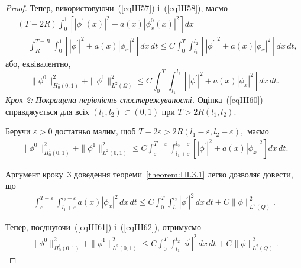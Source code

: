 \begin{proof}
Тепер, використовуючи~(\ref{eqIII57}) і~(\ref{eqIII58}), маємо
\begin{equation}\label{eqIII59}
    \begin{split}
    & (T-2R) \int^1_0 \left[|\phi^1(x)|^2 + a(x)|\phi^0_x(x)|^2\right] dx
    \\ & = \int^{T-R}_{R} \int^1_0
    \left[|\phi^\prime|^2 + a(x)|\phi_x|^2\right] dx\, dt
    \leq C \int^T_0 \int^{l_2}_{l_1} \left[|\phi^\prime|^2 + a(x)|\phi_x|^2\right] dx\, dt,
    \end{split}
\end{equation}
або, еквівалентно,
\begin{equation}\label{eqIII60}
    \|\phi^0\|^2_{H^1_0(0,1)} + \|\phi^1\|^2_{L^2(\Omega)}  \leq C \int^T_0 \int^{l_2}_{l_1} \left[|\phi^\prime|^2 + a(x)|\phi_x|^2\right] dx\, dt.
\end{equation}
\label{sec:III.4-d}
\emph{Крок 2: Покращена нерівність спостережуваності.}
Оцінка~(\ref{eqIII60}) справджується для всіх $(l_1, l_2) \subset (0,1)$ при $T > 2R(l_1, l_2)$.

Беручи $\varepsilon >0$ достатньо малим, щоб
$
T - 2\varepsilon > 2R(l_1 - \varepsilon, l_2 - \varepsilon),
$
маємо
\begin{equation}\label{eqIII61}
    \begin{split}
    \|\phi^0\|^2_{H^1_0(0,1)} + \|\phi^1\|^2_{L^2(0,1)}
    \leq C \int^{T-\varepsilon}_{\varepsilon} \int^{l_2-\varepsilon}_{l_1+\varepsilon}
    \left[|\phi^\prime|^2 + a(x)|\phi_x|^2\right] dx\, dt.
    \end{split}
\end{equation}

Аргумент кроку~3 доведення теореми~\ref{theorem:III.3.1} легко дозволяє довести, що
\begin{equation}\label{eqIII62}
    \begin{split}
    \int^{T-\varepsilon}_{\varepsilon} \int^{l_2-\varepsilon}_{l_1+\varepsilon}
    a(x) |\phi_x|^2\, dx\, dt
    \leq C \int^T_0 \int^{l_2}_{l_1} |\phi^\prime|^2\, dx\, dt + C\|\phi\|^{2}_{L^2(Q)}.
    \end{split}
\end{equation}

Тепер, поєднуючи~(\ref{eqIII61}) і~(\ref{eqIII62}), отримуємо
\begin{equation}\label{eqIII63}
    \begin{split}
    \|\phi^0\|^2_{H^1_{0}(0,1)} + \|\phi^1\|^2_{L^2(0,1)}
    \leq C \int^T_0 \int^{l_2}_{l_1} |\phi^\prime|^2\, dx\, dt + C\|\phi\|^{2}_{L^2(Q)}.
    \end{split}
\end{equation}


\end{proof}
